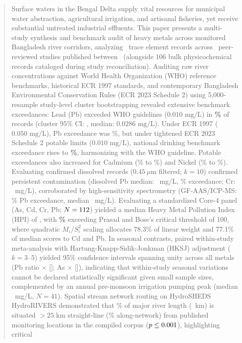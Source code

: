 \documentclass[conference]{IEEEtran}
\begin{document}
\begin{abstract}
Surface waters in the Bengal Delta supply vital resources for municipal water abstraction, agricultural irrigation, and artisanal fisheries, yet receive substantial untreated industrial effluents. This paper presents a multi-study synthesis and benchmark audit of heavy metals across monitored Bangladesh river corridors, analyzing \TotalMetalRecords\ trace element records across \TotalMetalStudies\ peer-reviewed studies published between \StudyWindowYears\ (alongside 106 bulk physicochemical records cataloged during study reconciliation). Auditing raw river concentrations against World Health Organization (WHO) reference benchmarks, historical ECR 1997 standards, and contemporary Bangladesh Environmental Conservation Rules (ECR 2023 Schedule 2) using 5,000-resample study-level cluster bootstrapping revealed extensive benchmark exceedances: Lead (Pb) exceeded WHO guidelines ($0.010\text{ mg/L}$) in \textbf{\LeadWhoExceedPct\%} of records (cluster 95\% CI: \LeadWhoClusterCi, median: $0.0286\text{ mg/L}$). Under ECR 1997 ($0.050\text{ mg/L}$), Pb exceedance was \LeadBdNineteenNinetySevenExceedPct\%, but under tightened ECR 2023 Schedule 2 potable limits ($0.010\text{ mg/L}$), national drinking benchmark exceedance rises to \textbf{\LeadBdTwentyTwentyThreeExceedPct\%}, harmonizing with the WHO guideline. Potable exceedances also increased for Cadmium (\CadmiumBdNineteenNinetySevenExceedPct\% to \CadmiumBdTwentyTwentyThreeExceedPct\%) and Nickel (\NickelBdNineteenNinetySevenExceedPct\% to \NickelBdTwentyTwentyThreeExceedPct\%). Evaluating confirmed dissolved records ($0.45\ \mu\text{m}$ filtered; $k=10$) confirmed persistent contamination (dissolved Pb median: \LeadConfirmedDissolvedMedian~mg/L, \LeadConfirmedDissolvedWhoPct\% exceedance; Cr: \ChromiumConfirmedDissolvedMedian~mg/L), corroborated by high-sensitivity spectrometry (GF-AAS/ICP-MS: \LeadHighSensExceedPct\% Pb exceedance, median \LeadHighSensMedian~mg/L). Evaluating a standardized Core-4 panel (As, Cd, Cr, Pb; $N=\HpiCoreFourN$) yielded a median Heavy Metal Pollution Index ($\mathrm{HPI}$) of \HpiCoreFourMedian, with \textbf{\HpiCoreFourShareAboveHundred\%} exceeding Prasad and Bose's critical threshold of 100, where quadratic $M_i/S_i^2$ scaling allocates 78.3\% of linear weight and 77.1\% of median scores to Cd and Pb. In seasonal contrasts, paired within-study meta-analysis with Hartung-Knapp-Sidik-Jonkman (HKSJ) adjustment ($k=3\text{--}5$) yielded 95\% confidence intervals spanning unity across all metals (Pb ratio \LeadWithinStudyRatio$\times$ [\LeadWithinStudyHksjCi]; As \ArsenicWithinStudyRatio$\times$ [\ArsenicWithinStudyHksjCi]), indicating that within-study seasonal variations cannot be declared statistically significant given small sample sizes, complemented by an annual pre-monsoon irrigation pumping peak (median \ArsenicPremonsoonMedian~mg/L, $N=41$). Spatial stream network routing on HydroSHEDS HydroRIVERS demonstrated that \UnsampledPctLengthTwentyFiveKm\% of major river length (\UnsampledLengthTwentyFiveKm~km) is situated $>25\text{ km}$ straight-line (\UnsampledPctLengthNetworkTwentyFiveKm\% along-network) from published monitoring locations in the compiled corpus ($p \NullModelPvalFormatted$), highlighting critical 
\end{abstract}
\end{document}
